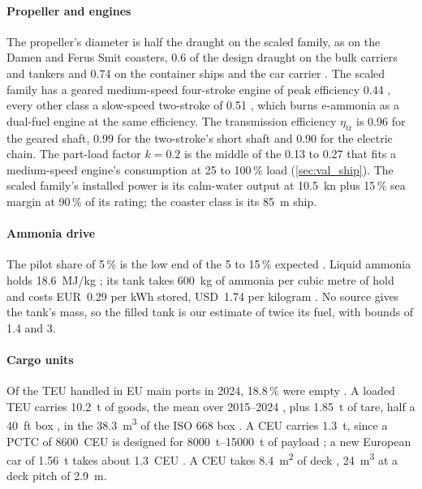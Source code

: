 \paragraph{Propeller and engines} The propeller's diameter is half the draught on the scaled family, as on the Damen and Ferus Smit coasters, 0.6 of the design draught on the bulk carriers and tankers \citep{man2019mr} and 0.74 on the container ships and the car carrier \citep{man2011}. The scaled family has a geared medium-speed four-stroke engine of peak efficiency 0.44 \citep{wartsila2024w20}, every other class a slow-speed two-stroke of 0.51 \citep[Table 19]{faber2020}, which burns e-ammonia as a dual-fuel engine at the same efficiency. The transmission efficiency $\eta_\mathrm{tr}$ is 0.96 for the geared shaft, 0.99 for the two-stroke's short shaft \citep{man2011} and 0.90 for the electric chain. The part-load factor $k=0.2$ is the middle of the 0.13 to 0.27 that fits a medium-speed engine's consumption at 25 to 100\,\% load \citep[p.~137]{man2024l2131} (\cref{sec:val_ship}). The scaled family's installed power is its calm-water output at \SI{10.5}{kn} plus 15\,\% sea margin at 90\,\% of its rating; the coaster class is its \SI{85}{m} ship.

\paragraph{Ammonia drive} The pilot share of 5\,\% is the low end of the 5 to 15\,\% expected \citep{mmmczcs2021fuel}. Liquid ammonia holds \SI{18.6}{MJ/kg} \citep{irena2021ship}; its tank takes \SI{600}{kg} of ammonia per cubic metre of hold \citep{mmmczcs2021fuel} and costs EUR~0.29 per kWh stored, USD~1.74 per kilogram \citep{kanchiralla2022}. No source gives the tank's mass, so the filled tank is our estimate of twice its fuel, with bounds of 1.4 and 3.

\paragraph{Cargo units}
\label{app:cargo_units}
Of the TEU handled in EU main ports in 2024, 18.8\,\% were empty \citep{eurostat_mar_mg_am_cvh}. A loaded TEU carries \SI{10.2}{t} of goods, the mean over 2015--2024 \citep{eurostat_mar_mg_am_cwhc,eurostat_mar_mg_am_cvh}, plus \SI{1.85}{t} of tare, half a \SI{40}{ft} box \citep{hapaglloyd_container_spec,eurostat_maritime_manual}, in the \SI{38.3}{m^3} of the ISO 668 box \citep{mao2020icct}. A CEU carries \SI{1.3}{t}, since a PCTC of \num{8600}~CEU is designed for \SIrange{8000}{15000}{t} of payload \citep{keh_8600ceu_df_pctc}; a new European car of \SI{1.56}{t} \citep{icct2025_eea_brief} takes about 1.3~CEU \citep{portantwerpbruges2024_ceu}. A CEU takes \SI{8.4}{m^2} of deck \citep{keh_8600ceu_df_pctc}, \SI{24}{m^3} at a deck pitch of \SI{2.9}{m}.

